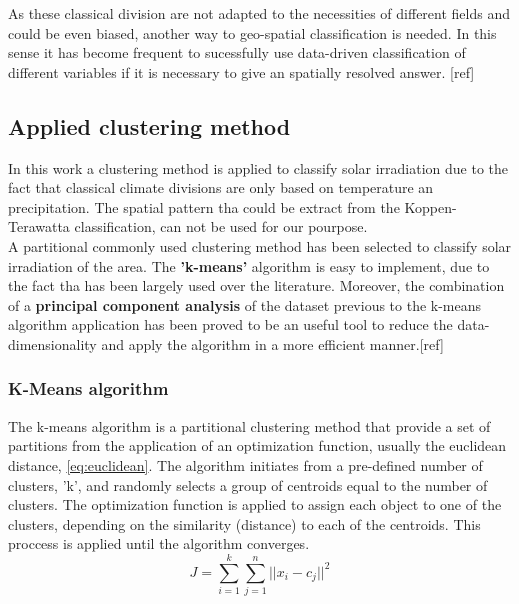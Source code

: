 
As these classical division are not adapted to the necessities of different fields and could be even biased, another way to geo-spatial classification is needed. In this sense it has become frequent to sucessfully use data-driven classification of different variables if it is necessary to give an spatially resolved answer. [ref]

\subsection{Applied clustering method}

In this work a clustering method is applied to classify solar irradiation due to the fact that classical climate divisions are only based on temperature an precipitation. The spatial pattern tha could be extract from the Koppen-Terawatta classification, can not be used for our pourpose.\\

A partitional commonly used clustering method has been selected to classify solar irradiation of the area. The \textbf{'k-means'} algorithm is easy to implement, due to the fact tha has been largely used over the literature. Moreover, the combination of a \textbf{principal component analysis} of the dataset previous to the k-means algorithm application has been proved to be an useful tool to reduce the data-dimensionality and apply the algorithm in a more efficient manner.[ref]

\subsubsection{K-Means algorithm}

The k-means algorithm is a partitional clustering method that provide a set of partitions from the application of an optimization function, usually the euclidean distance, \ref{eq:euclidean}. The algorithm initiates from a pre-defined number of clusters, 'k', and randomly selects a group of centroids equal to the number of clusters. The optimization function is applied to assign each object to one of the clusters, depending on the similarity (distance) to each of the centroids. This proccess is applied until the algorithm converges.\\

\begin{equation}\label{eq:euclidean}
    J =\sum_{i=1}^{k}\sum_{j=1}^{n}{||x_i-c_j||}^2
\end{equation}

